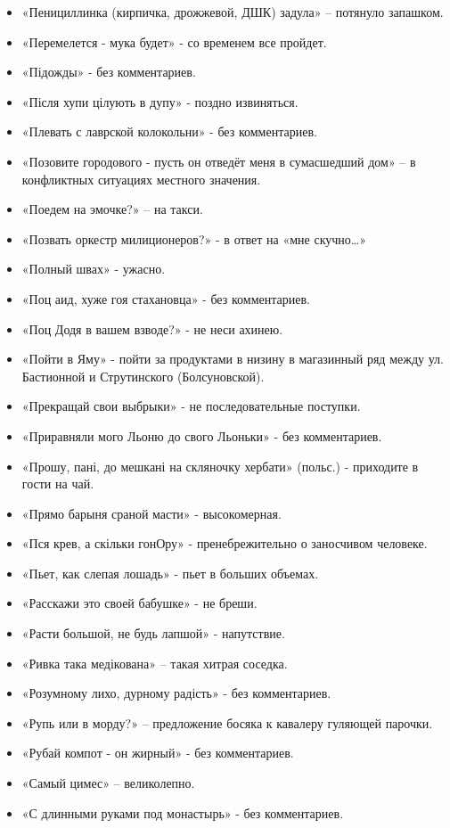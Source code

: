 \begin{itemize}
\item  «Пенициллинка (кирпичка, дрожжевой, ДШК) задула» – потянуло запашком.
\item  «Перемелется - мука будет» - со временем все пройдет.
\item  «Підожды» - без комментариев.
\item  «Після хупи цілують в дупу» - поздно извиняться.
\item  «Плевать с лаврской колокольни» - без комментариев.
\item  «Позовите городового - пусть он отведёт меня в сумасшедший дом» – в конфликтных ситуациях местного значения.
\item  «Поедем на эмочке?» – на такси.
\item  «Позвать оркестр милиционеров?» - в ответ на «мне скучно…»
\item  «Полный швах» - ужасно.
\item  «Поц аид, хуже гоя стахановца» - без комментариев.
\item  «Поц Додя в вашем взводе?» - не неси ахинею.
\item  «Пойти в Яму» - пойти за продуктами в низину в магазинный ряд между ул. Бастионной и Струтинского (Болсуновской). 
\item  «Прекращай свои выбрыки» - не последовательные поступки.
\item  «Приравняли мого Льоню до свого Льоньки» - без комментариев.
\item  «Прошу, пані, до мешкані на скляночку хербати» (польс.) - приходите в гости на чай.
\item  «Прямо барыня сраной масти» - высокомерная.
\item  «Пся крев, а скільки гонОру» - пренебрежительно о заносчивом человеке.
\item  «Пьет, как слепая лошадь» - пьет в больших объемах.
\item  «Расскажи это своей бабушке» - не бреши.
\item  «Расти большой, не будь лапшой» - напутствие.
\item  «Ривка така медікована» – такая хитрая соседка.
\item  «Розумному лихо, дурному радість» - без комментариев.
\item  «Рупь или в морду?» – предложение босяка к кавалеру гуляющей парочки.
\item  «Рубай компот - он жирный» - без комментариев.
\item  «Самый цимес» – великолепно.
\item  «С длинными руками под монастырь» - без комментариев.

\end{itemize}
